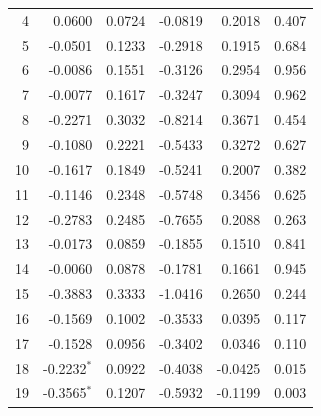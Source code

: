 \begin{longtable}{rrrrrr}
4 & 0.0600 & 0.0724 & -0.0819 & 0.2018 & 0.407 \\
5 & -0.0501 & 0.1233 & -0.2918 & 0.1915 & 0.684 \\
6 & -0.0086 & 0.1551 & -0.3126 & 0.2954 & 0.956 \\
7 & -0.0077 & 0.1617 & -0.3247 & 0.3094 & 0.962 \\
8 & -0.2271 & 0.3032 & -0.8214 & 0.3671 & 0.454 \\
9 & -0.1080 & 0.2221 & -0.5433 & 0.3272 & 0.627 \\
10 & -0.1617 & 0.1849 & -0.5241 & 0.2007 & 0.382 \\
11 & -0.1146 & 0.2348 & -0.5748 & 0.3456 & 0.625 \\
12 & -0.2783 & 0.2485 & -0.7655 & 0.2088 & 0.263 \\
13 & -0.0173 & 0.0859 & -0.1855 & 0.1510 & 0.841 \\
14 & -0.0060 & 0.0878 & -0.1781 & 0.1661 & 0.945 \\
15 & -0.3883 & 0.3333 & -1.0416 & 0.2650 & 0.244 \\
16 & -0.1569 & 0.1002 & -0.3533 & 0.0395 & 0.117 \\
17 & -0.1528 & 0.0956 & -0.3402 & 0.0346 & 0.110 \\
18 & -0.2232$^{*}$ & 0.0922 & -0.4038 & -0.0425 & 0.015 \\
19 & -0.3565$^{*}$ & 0.1207 & -0.5932 & -0.1199 & 0.003 \\
\end{longtable}
